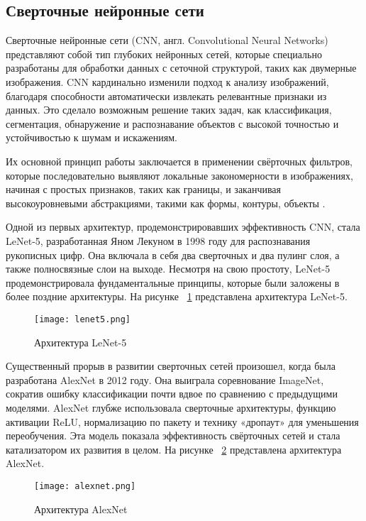 \subsection{Сверточные нейронные сети}

Сверточные нейронные сети (CNN, англ. Convolutional Neural Networks) представляют собой тип глубоких нейронных сетей, которые специально разработаны для обработки данных с сеточной структурой, таких как двумерные изображения. CNN кардинально изменили подход к анализу изображений, благодаря способности автоматически извлекать релевантные признаки из данных. Это сделало возможным решение таких задач, как классификация, сегментация, обнаружение и распознавание объектов с высокой точностью и устойчивостью к шумам и искажениям. 

Их основной принцип работы заключается в применении свёрточных фильтров, которые последовательно выявляют локальные закономерности в изображениях, начиная с простых признаков, таких как границы, и заканчивая высокоуровневыми абстракциями, такими как формы, контуры, объекты \cite{d21}.

Одной из первых архитектур, продемонстрировавших эффективность CNN, стала LeNet-5, разработанная Яном Лекуном в 1998 году для распознавания рукописных цифр. Она включала в себя два сверточных и два пулинг слоя, а также полносвязные слои на выходе. Несмотря на свою простоту, LeNet-5 продемонстрировала фундаментальные принципы, которые были заложены в более поздние архитектуры. На рисунке ~\ref{templ:image11} представлена архитектура LeNet-5. 
\begin{figure}[h]
	\texttt{[image: lenet5.png]}
	\caption{Архитектура LeNet-5}
	\label{templ:image11}
\end{figure}

Существенный прорыв в развитии сверточных сетей произошел, когда была разработана AlexNet в 2012 году. Она выиграла соревнование ImageNet, сократив ошибку классификации почти вдвое по сравнению с предыдущими моделями. AlexNet глубже использовала сверточные архитектуры, функцию активации ReLU, нормализацию по пакету и технику «дропаут» для уменьшения переобучения. Эта модель показала эффективность свёрточных сетей и стала катализатором их развития в целом. На рисунке ~\ref{templ:image12} представлена архитектура AlexNet.
\begin{figure}[h]
	\texttt{[image: alexnet.png]}
	\caption{Архитектура AlexNet}
	\label{templ:image12}
\end{figure}

